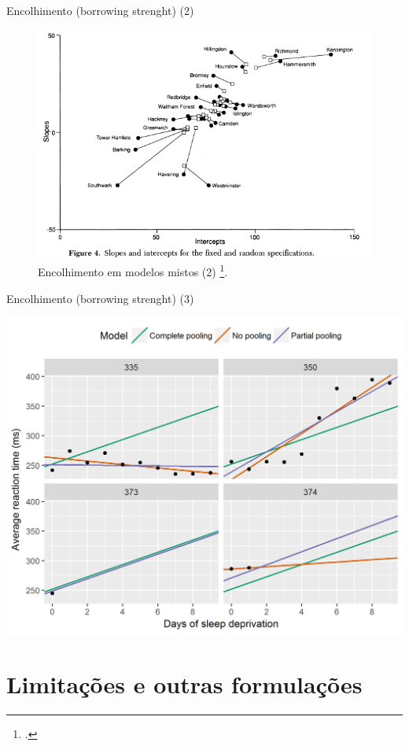 \documentclass[9pt,ignorenonframetext,aspectratio=169]{beamer}
\begin{document}
\begin{frame}{Encolhimento (borrowing strenght) (2)}
\protect\hypertarget{encolhimento-borrowing-strenght-2}{}

\begin{figure}

{\centering \includegraphics[width=0.7\linewidth]{../../images/shrinkage2} 

}

\caption{Encolhimento em modelos mistos (2) \footcite{jones1994}.}\label{fig:unnamed-chunk-2}
\end{figure}

\end{frame}

\begin{frame}{Encolhimento (borrowing strenght) (3)}
\protect\hypertarget{encolhimento-borrowing-strenght-3}{}

\begin{center}\includegraphics[width=0.5\linewidth]{../../images/zoomed-in-partial-pooling} \end{center}

\end{frame}

\hypertarget{limitauxe7uxf5es-e-outras-formulauxe7uxf5es}{%
\section{Limitações e outras
formulações}\label{limitauxe7uxf5es-e-outras-formulauxe7uxf5es}}
\end{document}
